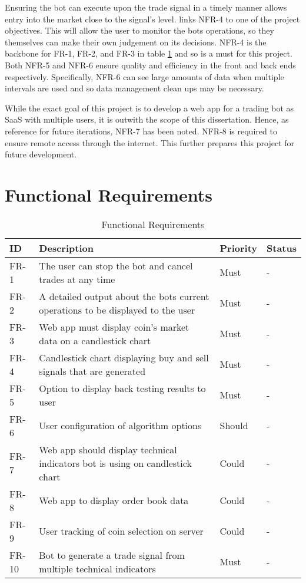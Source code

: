 Ensuring the bot can execute upon the trade signal in a timely manner allows entry into the market close to the signal's level. links NFR-4 to one of the project objectives. This will allow the user to monitor the bots operations, so they themselves can make their own judgement on its decisions. NFR-4 is the backbone for FR-1, FR-2, and FR-3 in table \ref{table:requirements:func} and so is a must for this project. Both NFR-5 and NFR-6 ensure quality and efficiency in the front and back ends respectively. Specifically, NFR-6 can see large amounts of data when multiple intervals are used and so data management clean ups may be necessary.

While the exact goal of this project is to develop a web app for a trading bot as SaaS with multiple users, it is outwith the scope of this dissertation. Hence, as reference for future iterations, NFR-7 has been noted. NFR-8 is required to ensure remote access through the internet. This further prepares this project for future development.



\section{Functional Requirements}
\label{sec:requirements:unc}



\begin{table}[htb!]
\centering
\begin{tabular}{|l|p{}|l|l|}
\hline
\textbf{ID} & \textbf{Description} & \textbf{Priority} & \textbf{Status} \\ \hline\hline
FR-1 & The user can stop the bot and cancel trades at any time & Must & - \\ \hline
FR-2 & A detailed output about the bots current operations to be displayed to the user & Must & - \\ \hline
FR-3 & Web app must display coin's market data on a candlestick chart & Must & - \\\hline
FR-4 & Candlestick chart displaying buy and sell signals that are generated & Must & - \\\hline
FR-5 & Option to display back testing results to user & Must & - \\ \hline
FR-6 & User configuration of algorithm options & Should & - \\ \hline
FR-7 & Web app should display technical indicators bot is using on candlestick chart & Could & - \\\hline
FR-8 & Web app to display order book data & Could & - \\\hline
FR-9 & User tracking of coin selection on server & Could & - \\ \hline
FR-10 & Bot to generate a trade signal from multiple technical indicators & Must & - \\ \hline
\end{tabular}
\caption{Functional Requirements}
\label{table:requirements:func}
\end{table}


